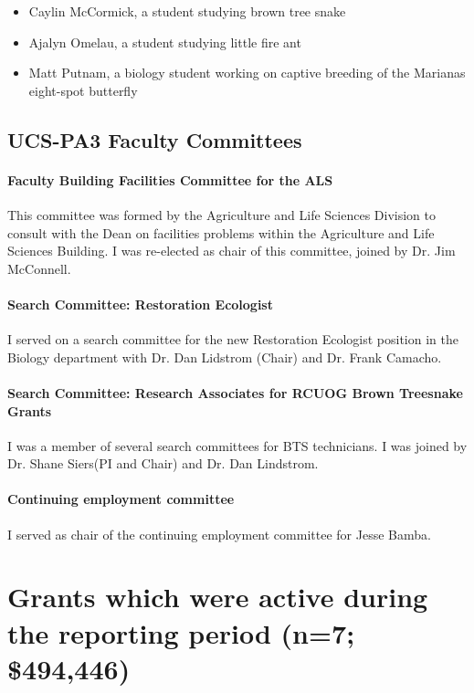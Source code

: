 \begin{itemize}
	\item Caylin McCormick, a student studying brown tree snake
	\item Ajalyn Omelau, a student studying little fire ant
	\item Matt Putnam, a biology student working on captive breeding of the Marianas eight-spot butterfly
\end{itemize}

\subsection{UCS-PA3 Faculty Committees}

\paragraph{Faculty Building Facilities Committee for the ALS}

This committee was formed by the Agriculture and Life Sciences Division
to consult with the Dean on facilities problems within the Agriculture
and Life Sciences Building. I was re-elected as chair of this committee, joined by Dr. Jim McConnell.

\paragraph{Search Committee: Restoration Ecologist}

I served on a search committee for the new Restoration Ecologist position in the Biology department with Dr. Dan Lidstrom (Chair) and Dr. Frank Camacho.

\paragraph{Search Committee: Research Associates for RCUOG Brown Treesnake Grants}

I was a member of several search committees for BTS technicians. I was joined by Dr. Shane Siers(PI and Chair) and Dr. Dan Lindstrom.

\paragraph{Continuing employment committee}

I served as chair of the continuing employment committee for Jesse Bamba.

\newpage
\section{Grants which were active during the reporting period (n=7; \$494,446)}

